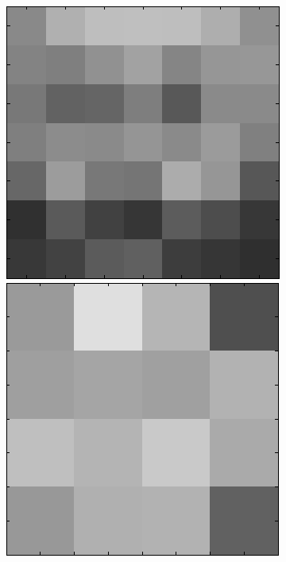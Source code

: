 \begin{figure}[ht]
 \includegraphics[width=\textwidth*11/100]{ch5/figures/XM2VTS_8_2.png}\\
 \includegraphics[width=\textwidth*11/100]{ch5/figures/XM2VTS_1_3.png}

\end{figure}

